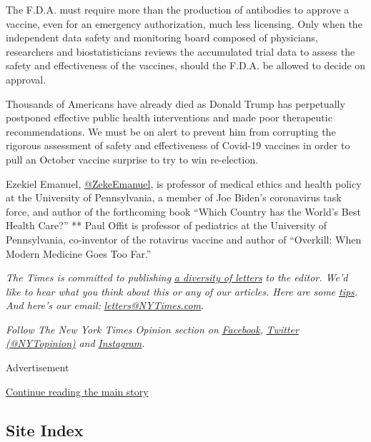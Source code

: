 The F.D.A. must require more than the production of antibodies to
approve a vaccine, even for an emergency authorization, much less
licensing. Only when the independent data safety and monitoring board
composed of physicians, researchers and biostatisticians reviews the
accumulated trial data to assess the safety and effectiveness of the
vaccines, should the F.D.A. be allowed to decide on approval.

Thousands of Americans have already died as Donald Trump has perpetually
postponed effective public health interventions and made poor
therapeutic recommendations. We must be on alert to prevent him from
corrupting the rigorous assessment of safety and effectiveness of
Covid-19 vaccines in order to pull an October vaccine surprise to try to
win re-election.

Ezekiel Emanuel,
\href{https://www.google.com/search?q=\%40ZekeEmanuel\&rlz=1C5CHFA_enUS745US745\&oq=\%40ZekeEmanuel\&aqs=chrome..69i57.1069j0j4\&sourceid=chrome\&ie=UTF-8}{@ZekeEmanuel},
is professor of medical ethics and health policy at the University of
Pennsylvania, a member of Joe Biden's coronavirus task force, and author
of the forthcoming book ``Which Country has the World's Best Health
Care?'' ** Paul Offit is professor of pediatrics at the University of
Pennsylvania, co-inventor of the rotavirus vaccine and author of
``Overkill: When Modern Medicine Goes Too Far.''

\emph{The Times is committed to publishing}
\href{https://www.nytimes3xbfgragh.onion/2019/01/31/opinion/letters/letters-to-editor-new-york-times-women.html}{\emph{a
diversity of letters}} \emph{to the editor. We'd like to hear what you
think about this or any of our articles. Here are some}
\href{https://help.nytimes3xbfgragh.onion/hc/en-us/articles/115014925288-How-to-submit-a-letter-to-the-editor}{\emph{tips}}\emph{.
And here's our email:}
\href{mailto:letters@NYTimes.com}{\emph{letters@NYTimes.com}}\emph{.}

\emph{Follow The New York Times Opinion section on}
\href{https://www.facebookcorewwwi.onion/nytopinion}{\emph{Facebook}}\emph{,}
\href{http://twitter.com/NYTOpinion}{\emph{Twitter (@NYTopinion)}}
\emph{and}
\href{https://www.instagram.com/nytopinion/}{\emph{Instagram}}\emph{.}

Advertisement

\protect\hyperlink{after-bottom}{Continue reading the main story}

\hypertarget{site-index}{%
\subsection{Site Index}\label{site-index}}

